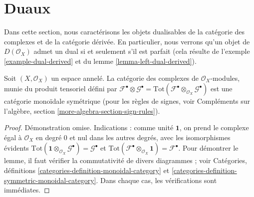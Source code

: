 \section{Duaux}

\label{section-duals}

\noindent
Dans cette section, nous caractérisons les objets dualisables de la catégorie des complexes et de la catégorie dérivée. En particulier, nous verrons qu'un objet de $D(\mathcal{O}_X)$ admet un dual si et seulement s'il est parfait (cela résulte de l'exemple \ref{example-dual-derived} et du lemme \ref{lemma-left-dual-derived}).

\begin{lemma}

\label{lemma-symmetric-monoidal-cat-complexes}

Soit $(X, \mathcal{O}_X)$ un espace annelé. La catégorie des complexes de $\mathcal{O}_X$-modules, munie du produit tensoriel défini par
$\mathcal{F}^\bullet \otimes \mathcal{G}^\bullet =
\text{Tot}(\mathcal{F}^\bullet \otimes_{\mathcal{O}_X} \mathcal{G}^\bullet)$
est une catégorie monoïdale symétrique (pour les règles de signes, voir Compléments sur l'algèbre, section \ref{more-algebra-section-sign-rules}).

\end{lemma}

\begin{proof}
Démonstration omise. Indications : comme unité $\mathbf{1}$, on prend le complexe égal à $\mathcal{O}_X$ en degré $0$ et nul dans les autres degrés, avec les isomorphismes évidents $\text{Tot}(\mathbf{1} \otimes_{\mathcal{O}_X} \mathcal{G}^\bullet) =
\mathcal{G}^\bullet$ et $\text{Tot}(\mathcal{F}^\bullet \otimes_{\mathcal{O}_X} \mathbf{1}) =
\mathcal{F}^\bullet$. Pour démontrer le lemme, il faut vérifier la commutativité de divers diagrammes ; voir Catégories, définitions \ref{categories-definition-monoidal-category} et \ref{categories-definition-symmetric-monoidal-category}. Dans chaque cas, les vérifications sont immédiates.
\end{proof}

